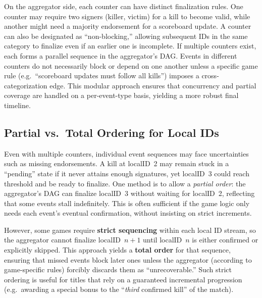 \documentclass[11pt]{article}
\begin{document}
On the aggregator side, each counter can have distinct finalization rules. One counter may require two signers (killer, victim) for a kill to become valid, while another might need a majority endorsement for a scoreboard update. A counter can also be designated as “non-blocking,” allowing subsequent IDs in the same category to finalize even if an earlier one is incomplete. If multiple counters exist, each forms a parallel sequence in the aggregator’s DAG. Events in different counters do not necessarily block or depend on one another unless a specific game rule (e.g.\ “scoreboard updates must follow all kills”) imposes a cross-categorization edge. This modular approach ensures that concurrency and partial coverage are handled on a per-event-type basis, yielding a more robust final timeline.

\subsection{Partial vs.\ Total Ordering for Local IDs}
\label{sec:partialMultiID}

Even with multiple counters, individual event sequences may face uncertainties such as missing endorsements. A kill at localID~2 may remain stuck in a “pending” state if it never attains enough signatures, yet localID~3 could reach threshold and be ready to finalize. One method is to allow a \textit{partial order}: the aggregator’s DAG can finalize localID~3 without waiting for localID~2, reflecting that some events stall indefinitely. This is often sufficient if the game logic only needs each event’s eventual confirmation, without insisting on strict increments.

However, some games require \textbf{strict sequencing} within each local ID stream, so the aggregator cannot finalize localID~$n+1$ until localID~$n$ is either confirmed or explicitly skipped. This approach yields a \textbf{total order} for that sequence, ensuring that missed events block later ones unless the aggregator (according to game-specific rules) forcibly discards them as “unrecoverable.” Such strict ordering is useful for titles that rely on a guaranteed incremental progression (e.g.\ awarding a special bonus to the “\emph{third} confirmed kill” of the match). 
\end{document}
